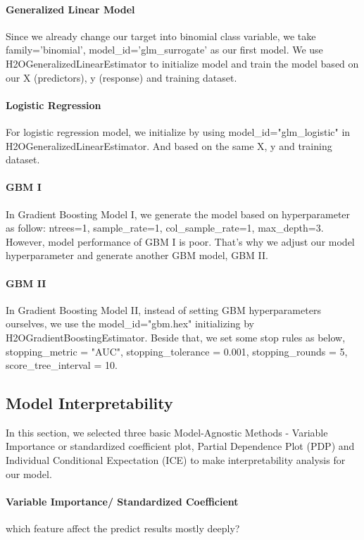 \documentclass{article}
\begin{document}
\paragraph{Generalized Linear Model}
Since we already change our target into binomial class variable, we take family='binomial', model\_id='glm\_surrogate' as our first model. We use H2OGeneralizedLinearEstimator to initialize model and train the model based on our X (predictors), y (response) and training dataset. 
\paragraph{Logistic Regression}
For logistic regression model, we initialize by using model\_id="glm\_logistic" in H2OGeneralizedLinearEstimator. And based on the same X, y and training dataset.
\paragraph{GBM I}
In Gradient Boosting Model I, we generate the model based on hyperparameter as follow: ntrees=1, sample\_rate=1, col\_sample\_rate=1, max\_depth=3. However, model performance of GBM I is poor. That’s why we adjust our model hyperparameter and generate another GBM model, GBM II.
\paragraph{GBM II}
In Gradient Boosting Model II, instead of setting GBM hyperparameters ourselves, we use the model\_id="gbm.hex" initializing by H2OGradientBoostingEstimator. Beside that, we set some stop rules as below, stopping\_metric = "AUC", stopping\_tolerance = 0.001, stopping\_rounds = 5, score\_tree\_interval = 10.

\subsection{Model Interpretability}
In this section, we selected three basic Model-Agnostic Methods - Variable Importance or standardized coefficient plot, Partial Dependence Plot (PDP) and Individual Conditional Expectation (ICE) to make interpretability analysis for our model.

\paragraph{Variable Importance/ Standardized Coefficient}
which feature affect the predict results mostly deeply? 
\end{document}
